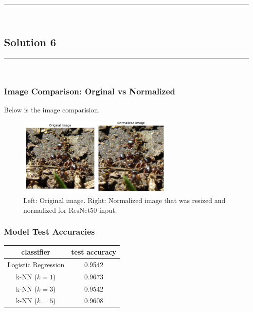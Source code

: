 \documentclass{article}
\begin{document}
\noindent\rule{\textwidth}{0.4pt}\\

\newpage

\subsection*{Solution 6}
\noindent\rule{\textwidth}{0.4pt}\\

\subsubsection*{Image Comparison: Orginal vs Normalized}
\parbox{\textwidth}{
  
Below is the image comparision.
}

\begin{figure}[htbp]
    \centering
    \includegraphics[width=0.7\textwidth]{q6_image_comparison.png}
    \caption{Left: Original image. Right: Normalized image that was resized and normalized for ResNet50 input.}
\end{figure}



\subsubsection*{Model Test Accuracies}
\parbox{\textwidth}{
\begin{center}
\begin{tabular}{|c|c|}
\hline
\textbf{classifier} & \textbf{test accuracy} \\
\hline
Logistic Regression & 0.9542 \\
k-NN ($k=1$) & 0.9673 \\
k-NN ($k=3$) & 0.9542 \\
k-NN ($k=5$) & 0.9608 \\
\hline
\end{tabular}
\end{center}
}
\end{document}
